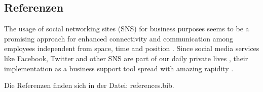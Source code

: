 \subsection{Referenzen}
The usage of social networking sites (SNS) for business purposes seems to be a promising approach for enhanced connectivity and communication among employees independent from space, time and position \cite{dimicco2008motivations}. Since social media services like Facebook, Twitter and other SNS are part of our daily private lives \cite{stocker2013exploring}, their implementation as a business support tool spread with amazing rapidity \cite{koch2009enterprise}. 

Die Referenzen finden sich in der Datei: references.bib.




